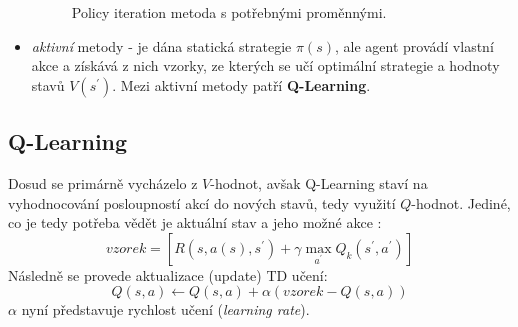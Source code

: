 \begin{itemize}
\begin{figure}[!htbp]
\begin{center}
	\caption{Policy iteration metoda s potřebnými proměnnými.}
	\label{img:policyeval}
\end{center}
\end{figure}

\item \textit{aktivní} metody - je dána statická strategie $\pi(s)$, ale agent provádí vlastní akce a získává z nich vzorky, ze kterých se učí optimální strategie a hodnoty stavů $V(s^\prime)$. Mezi aktivní metody patří \textbf{Q-Learning}.
\end{itemize}

\subsection{Q-Learning}
Dosud se primárně vycházelo z $V$-hodnot, avšak Q-Learning staví na vyhodnocování posloupností akcí do nových stavů, tedy využití $Q$-hodnot. Jediné, co je tedy potřeba vědět je aktuální stav a jeho možné akce \cite{RLIntro}:
\begin{displaymath}
vzorek = \left [ R(s,a(s),s^\prime)+\gamma \max_{a^\prime}Q_{k}(s^\prime,a^\prime) \right]
\end{displaymath}
Následně se provede aktualizace (update) TD učení:
\begin{displaymath}
 Q(s,a) \leftarrow  Q(s,a) + \alpha(vzorek - Q(s,a))
\end{displaymath}
$\alpha$ nyní představuje rychlost učení (\textit{learning rate}).



